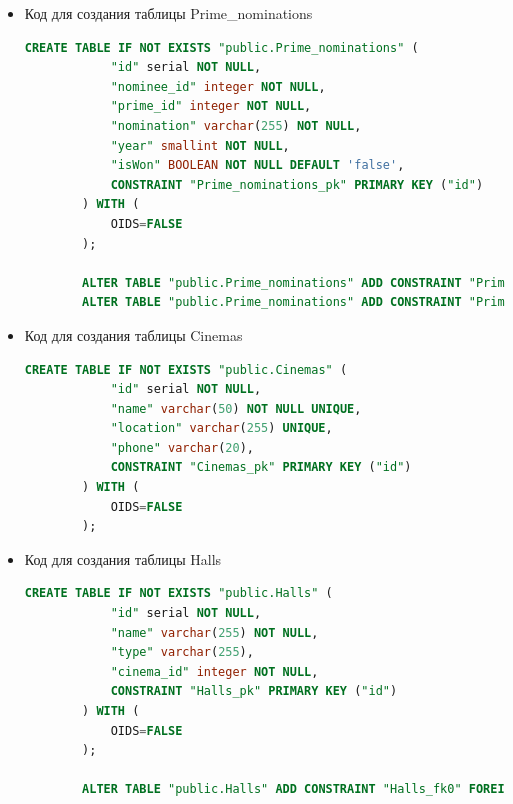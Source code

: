 \documentclass[a4paper,12pt]{article}
\renewcommand{\^}[2]{#1^{\, #2} \kern -1pt}
\newcommand{\1}{\kern 1pt}
\newcommand{\0}{\kern -1pt}
\begin{document}
\begin{itemize}
	\begin{lstlisting}[style=vscode-dark, language=SQL, label={lst:sql8}]
		CREATE TABLE IF NOT EXISTS "public.Primes" (
			"id" serial NOT NULL,
			"name" varchar(50) NOT NULL UNIQUE,
			CONSTRAINT "Primes_pk" PRIMARY KEY ("id")
		) WITH (
			OIDS=FALSE
		);
	\end{lstlisting}

	\item Код для создания таблицы Prime\_nominations

	\begin{lstlisting}[style=vscode-dark, language=SQL, label={lst:sql9}]
		CREATE TABLE IF NOT EXISTS "public.Prime_nominations" (
			"id" serial NOT NULL,
			"nominee_id" integer NOT NULL,
			"prime_id" integer NOT NULL,
			"nomination" varchar(255) NOT NULL,
			"year" smallint NOT NULL,
			"isWon" BOOLEAN NOT NULL DEFAULT 'false',
			CONSTRAINT "Prime_nominations_pk" PRIMARY KEY ("id")
		) WITH (
			OIDS=FALSE
		);
		
		ALTER TABLE "public.Prime_nominations" ADD CONSTRAINT "Prime_nominations_fk0" FOREIGN KEY ("nominee_id") REFERENCES "public.Nominees"("id");
		ALTER TABLE "public.Prime_nominations" ADD CONSTRAINT "Prime_nominations_fk1" FOREIGN KEY ("prime_id") REFERENCES "public.Primes"("id");
	\end{lstlisting}
	
	\item Код для создания таблицы Cinemas
	
	\begin{lstlisting}[style=vscode-dark, language=SQL, label={lst:sql10}]
		CREATE TABLE IF NOT EXISTS "public.Cinemas" (
			"id" serial NOT NULL,
			"name" varchar(50) NOT NULL UNIQUE,
			"location" varchar(255) UNIQUE,
			"phone" varchar(20),
			CONSTRAINT "Cinemas_pk" PRIMARY KEY ("id")
		) WITH (
			OIDS=FALSE
		);
	\end{lstlisting}
	
	\item Код для создания таблицы Halls
	
	\begin{lstlisting}[style=vscode-dark, language=SQL, label={lst:sql11}]
		CREATE TABLE IF NOT EXISTS "public.Halls" (
			"id" serial NOT NULL,
			"name" varchar(255) NOT NULL,
			"type" varchar(255),
			"cinema_id" integer NOT NULL,
			CONSTRAINT "Halls_pk" PRIMARY KEY ("id")
		) WITH (
			OIDS=FALSE
		);
		
		ALTER TABLE "public.Halls" ADD CONSTRAINT "Halls_fk0" FOREIGN KEY ("cinema_id") REFERENCES "public.Cinemas"("id");
	\end{lstlisting}


\end{itemize}
\end{document}

